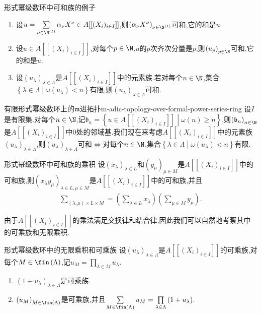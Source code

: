 \begin{example}{形式幂级数环中可和族的例子}{}
	\begin{enumerate}
		\item 设$u=\sum\limits_{\nu\in\N^{\left(I\right)}}\alpha_{\nu}X^{\nu}\in A[[(X_{i})_{i\in I}]]$,则$\left(\alpha_{\nu}X^{\nu}\right)_{\nu\in\N^{\left(I\right)}}$可和,它的和是$u$.
		\item 设$u\in A[[(X_{i})_{i\in I}]]$,对每个$p\in\N$,$u$的$p$次齐次分量是$p$,则$\left(u_{p}\right)_{p\in\N}$可和,它的和是$u$.
		\item 设$\left(u_{\lambda}\right)_{\lambda\in\Lambda}$是$A[[(X_{i})_{i\in I}]]$中的元素族.若对每个$n\in\N$,集合$\left\{\lambda\in\Lambda\middle|\omega\left(u_{\lambda}\right)<n\right\}$有限,则$\left(u_{\lambda}\right)_{\lambda\in\Lambda}$可和.
	\end{enumerate}
\end{example}

\begin{remark}{有限形式幂级数环上的$\mathfrak{m}$进拓扑}{m-adic-topology-over-formal-power-series-ring}
	设$I$是有限集.对每个$n\in\N$,记$\mathfrak{b}_{n}=\left\{u\in A[[(X_{i})_{i\in I}]]\middle|\omega\left(n\right)\geq n\right\}$,则$\left(\mathfrak{b}_{n}\right)_{n\in\N}$是$A[[(X_{i})_{i\in I}]]$中$0$处的邻域基.我们现在来考虑$A[[(X_{i})_{i\in I}]]$中的元素族$\left(u_{\lambda}\right)_{\lambda\in\Lambda}$,则$\left(u_{\lambda}\right)_{\lambda\in\Lambda}$可和$\iff$对每个$n\in\N$,集合$\left\{\lambda\in\Lambda\middle|\omega\left(u_{\lambda}\right)<n\right\}$有限.
\end{remark}

\begin{proposition}{形式幂级数环中可和族的乘积}{}
	设$\left(x_{\lambda}\right)_{\lambda\in L}$和$\left(y_{\mu}\right)_{\mu\in M}$是$A[[(X_{i})_{i\in I}]]$中的可和族,则$\left(x_{\lambda}y_{\mu}\right)_{\lambda\in L,\mu\in M}$是$A[[(X_{i})_{i\in I}]]$中的可和族,并且
	\begin{align*}
		\sum\limits_{\left(\lambda,\mu\right)\times L\times M}=\left(\sum\limits_{\lambda\in L}x_{\lambda}\right)\left(\sum\limits_{\mu\in M}y_{\mu}\right).
	\end{align*}
\end{proposition}

\begin{remark}{}{}
	由于$A[[(X_{i})_{i\in I}]]$的乘法满足交换律和结合律,因此我们可以自然地考察其中的可乘族和无限乘积.
\end{remark}

\begin{proposition}{形式幂级数环中的无限乘积和可乘族}{}
	设$\left(u_{\lambda}\right)_{\lambda\in\Lambda}$是$A[[(X_{i})_{i\in I}]]$的可乘族,对每个$M\in\fin\left(\Lambda\right)$,记$u_{M}=\prod\limits_{\lambda\in M}u_{\lambda}$.
	\begin{enumerate}
		\item $\left(1+u_{\lambda}\right)_{\lambda\in\Lambda}$是可乘族.
		\item $\left(u_{M}\right)_{M\in\fin\left(\Lambda\right)}$是可乘族,并且$\sum\limits_{M\in\fin\left(\Lambda\right)}u_{M}=\prod\limits_{\lambda\in\Lambda}\left(1+u_{\lambda}\right)$.
	\end{enumerate}
\end{proposition}

